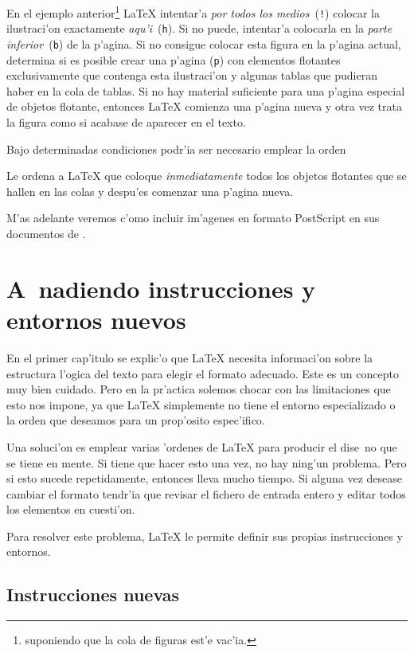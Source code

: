 \noindent En el ejemplo anterior\footnote{suponiendo que la cola de
  figuras est'e vac'ia.} \LaTeX{} intentar'a \emph{por todos los
  medios}~(\texttt{!}) colocar la ilustraci'on exactamente
\emph{aqu'i}~(\texttt{h}). Si no puede, intentar'a colocarla en la
\emph{parte inferior}~(\texttt{b}) de la p'agina. Si no consigue
colocar esta figura en la p'agina actual, determina si es posible
crear una p'agina (\verb|p|) con elementos flotantes exclusivamente
que contenga esta ilustraci'on y algunas tablas que pudieran haber en
la cola de tablas. Si no hay material suficiente para una p'agina
especial de objetos flotante, entonces \LaTeX{} comienza una p'agina
nueva y otra vez trata la figura como si acabase de aparecer en el
texto.

Bajo determinadas condiciones podr'ia ser necesario emplear la orden
\begin{command}
\end{command}
\noindent Le ordena a \LaTeX{} que coloque \emph{inmediatamente} todos
los objetos flotantes que se hallen en las colas y despu'es comenzar
una p'agina nueva.

M'as adelante veremos c'omo incluir im'agenes en formato PostScript en
sus documentos de \LaTeXe.


\section{A~nadiendo instrucciones y entornos nuevos}

En el primer cap'itulo se explic'o que \LaTeX{} necesita informaci'on
sobre la estructura l'ogica del texto para elegir el formato
adecuado. Este es un concepto muy bien cuidado. Pero en la pr'actica
solemos chocar con las limitaciones que esto nos impone, ya que
\LaTeX{} simplemente no tiene el entorno especializado o la orden que
deseamos para un prop'osito espec'ifico.

Una soluci'on es emplear varias 'ordenes de \LaTeX{} para producir el
dise~no que se tiene en mente. Si tiene que hacer esto una vez, no hay
ning'un problema. Pero si esto sucede repetidamente, entonces lleva
mucho tiempo. Si alguna vez desease cambiar el formato tendr'ia que
revisar el fichero de entrada entero y editar todos los elementos en
cuesti'on.

Para resolver este problema, \LaTeX{} le permite definir sus propias
instrucciones y entornos.

\subsection{Instrucciones nuevas}


